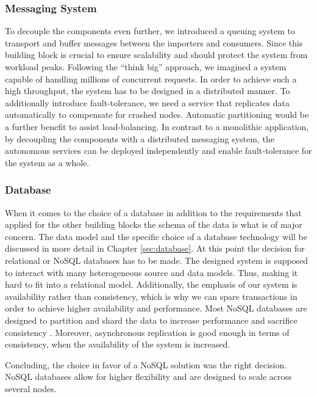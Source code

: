 \subsubsection{Messaging System}\label{messaging-system}

To decouple the components even further, we introduced a queuing system
to transport and buffer messages between the importers and consumers.
Since this building block is crucial to ensure scalability and should
protect the system from workload peaks. Following the ``think big''
approach, we imagined a system capable of handling millions of
concurrent requests. In order to achieve such a high throughput, the
system has to be designed in a distributed manner. To additionally
introduce fault-tolerance, we need a service that replicates data
automatically to compensate for crashed nodes. Automatic partitioning
would be a further benefit to assist load-balancing. In contrast to a
monolithic application, by decoupling the components with a distributed
messaging system, the autonomous services can be deployed independently
and enable fault-tolerance for the system as a whole.

\subsubsection{Database}\label{database}

When it comes to the choice of a database in addition to the
requirements that applied for the other building blocks the schema of
the data is what is of major concern. The data model and the specific
choice of a database technology will be discussed in more detail in
Chapter \ref{sec:database}. At this point the decision for relational or
NoSQL databases has to be made. The designed system is supposed to
interact with many heterogeneous source and data models. Thus, making it
hard to fit into a relational model. Additionally, the emphasis of our
system is availability rather than consistency, which is why we can
spare transactions in order to achieve higher availability and
performance. Most NoSQL databases are designed to partition and shard
the data to increase performance and sacrifice consistency \cite{Chatzakis.2016}.
Moreover, asynchronous replication is good enough in terms of
consistency, when the availability of the system is increased.

Concluding, the choice in favor of a NoSQL solution was the right
decision. NoSQL databases allow for higher flexibility and are designed
to scale across several nodes.

